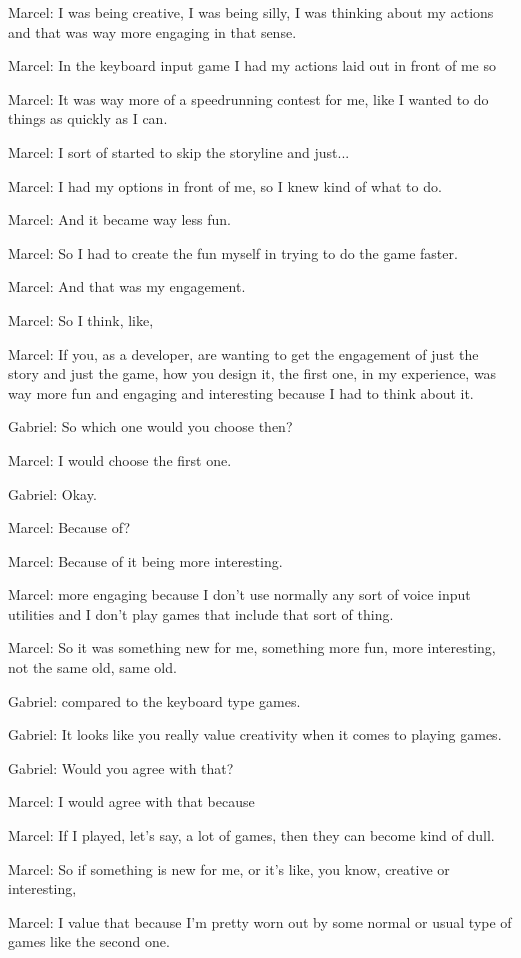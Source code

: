 Marcel: I was being creative, I was being silly, I was thinking about my actions and that was way more engaging in that sense.

Marcel: In the keyboard input game I had my actions laid out in front of me so

Marcel: It was way more of a speedrunning contest for me, like I wanted to do things as quickly as I can.

Marcel: I sort of started to skip the storyline and just...

Marcel: I had my options in front of me, so I knew kind of what to do.

Marcel: And it became way less fun.

Marcel: So I had to create the fun myself in trying to do the game faster.

Marcel: And that was my engagement.

Marcel: So I think, like,

Marcel: If you, as a developer, are wanting to get the engagement of just the story and just the game, how you design it, the first one, in my experience, was way more fun and engaging and interesting because I had to think about it.

Gabriel: So which one would you choose then?

Marcel: I would choose the first one.

Gabriel: Okay.

Marcel: Because of?

Marcel: Because of it being more interesting.

Marcel: more engaging because I don't use normally any sort of voice input utilities and I don't play games that include that sort of thing.

Marcel: So it was something new for me, something more fun, more interesting, not the same old, same old.

Gabriel: compared to the keyboard type games.

Gabriel: It looks like you really value creativity when it comes to playing games.

Gabriel: Would you agree with that?

Marcel: I would agree with that because

Marcel: If I played, let's say, a lot of games, then they can become kind of dull.

Marcel: So if something is new for me, or it's like, you know, creative or interesting,

Marcel: I value that because I'm pretty worn out by some normal or usual type of games like the second one.

